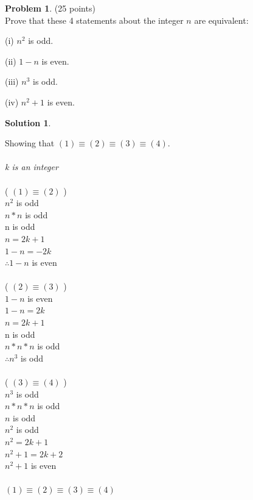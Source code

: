 \documentclass{article}
\theoremstyle{definition}
\newtheorem{problem}{Problem}
\newtheorem*{solution}{Solution}
\begin{document}
\newpage

\begin{problem} (25 points)\\
Prove that these 4 statements about the integer $n$ are equivalent:
\begin{compactenum}
\item[(i)] $n^2$ is odd.
\item[(ii)] $1-n$ is even.
\item[(iii)] $n^3$ is odd.
\item[(iv)] $n^2+1$ is even.
\end{compactenum}
\end{problem}

\begin{solution}\ \\
\begin{compactenum}
Showing that $(1) \equiv (2) \equiv (3) \equiv (4)$.\ \\
\ \\
\textit{ k is an integer}\ \\
\ \\
( $(1) \equiv (2)$ )\ \\ 
$n^2$ is odd\ \\
$n*n$ is odd\ \\
n is odd\ \\
$n = 2k + 1$\ \\
$1-n = -2k$\ \\
$\therefore 1-n$ is even\ \\
\ \\ 
( $(2) \equiv (3)$ )\ \\ 
$1-n$ is even\ \\
$1-n = 2k$\ \\
$n = 2k+1$\ \\
n is odd\ \\
$n*n*n$ is odd\ \\
$\therefore n^3$ is odd\ \\
\ \\ 
( $(3) \equiv (4)$ )\ \\ 
$n^3$ is odd\ \\
$n*n*n$ is odd\ \\
$n$ is odd\ \\
$n^2$ is odd\ \\
$n^2 = 2k+1$ \xleftarrow[]{} \ \\
$n^2+1 = 2k + 2$\ \\
$n^2+1$ is even\ \\
\ \\
\therefore $(1) \equiv (2) \equiv (3) \equiv (4)$

\end{compactenum}
\end{solution}
\end{document}
